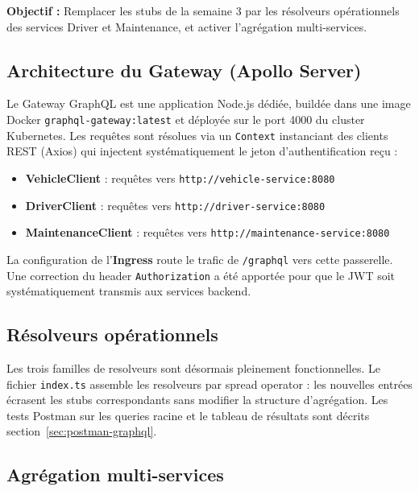 \documentclass[12pt,a4paper]{article}
\begin{document}
\begin{infobox}
\textbf{Objectif :} Remplacer les stubs de la semaine 3 par les résolveurs opérationnels des services Driver et Maintenance, et activer l'agrégation multi-services.
\end{infobox}

\subsection{Architecture du Gateway (Apollo Server)}

Le Gateway GraphQL est une application Node.js dédiée, buildée dans une image Docker \texttt{graphql-gateway:latest} et déployée sur le port 4000 du cluster Kubernetes. Les requêtes sont résolues via un \texttt{Context} instanciant des clients REST (Axios) qui injectent systématiquement le jeton d'authentification reçu :

\begin{itemize}
    \item \textbf{VehicleClient} : requêtes vers \texttt{http://vehicle-service:8080}
    \item \textbf{DriverClient} : requêtes vers \texttt{http://driver-service:8080}
    \item \textbf{MaintenanceClient} : requêtes vers \texttt{http://maintenance-service:8080}
\end{itemize}

La configuration de l'\textbf{Ingress} route le trafic de \texttt{/graphql} vers cette passerelle. Une correction du header \texttt{Authorization} a été apportée pour que le JWT soit systématiquement transmis aux services backend.

\subsection{Résolveurs opérationnels}

Les trois familles de resolveurs sont désormais pleinement fonctionnelles. Le fichier \texttt{index.ts} assemble les resolveurs par spread operator : les nouvelles entrées écrasent les stubs correspondants sans modifier la structure d'agrégation. Les tests Postman sur les queries racine et le tableau de résultats sont décrits section~\ref{sec:postman-graphql}.

\subsection{Agrégation multi-services}
\label{sec:graphql-aggregation}
\end{document}
